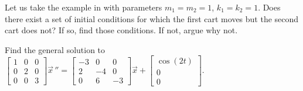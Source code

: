 \begin{exercise}
Let us take the example in  with
parameters
$m_1 = m_2 = 1$, $k_1 = k_2 = 1$.  Does there exist a set of initial
conditions for which the first cart moves but the second cart does not?
If so, find those conditions.  If not, argue why not.
\end{exercise}

\setcounter{exercise}{100}

\begin{exercise}
Find the general solution to
$\left[ \begin{smallmatrix}
1 & 0 & 0\\
0 & 2 & 0\\
0 & 0 & 3
\end{smallmatrix}\right]
\vec{x}\,''
=
\left[ \begin{smallmatrix}
-3 & 0 & 0 \\
2 & -4 & 0 \\
0 & 6 & -3
\end{smallmatrix}\right]
\vec{x}
+ 
\left[ \begin{smallmatrix}
\cos(2t) \\ 0 \\ 0
\end{smallmatrix}\right]$.
\end{exercise}

